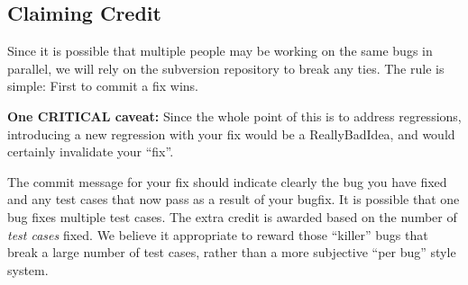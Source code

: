 \documentclass{article}
\begin{document}
\subsection{Claiming Credit}
Since it is possible that multiple people may be working on the same bugs in
parallel, we will rely on the subversion repository to break any ties. The
rule is simple: First to commit a fix wins.

\vspace{1 em}
{\bf One CRITICAL caveat:} Since the whole point of this is to address
regressions, introducing a new regression with your fix would be a
ReallyBadIdea\texttrademark, and would certainly invalidate your ``fix''.
\vspace{1 em}

The commit message for your fix should indicate clearly the bug you have fixed
and any test cases that now pass as a result of your bugfix. It is possible
that one bug fixes multiple test cases. The extra credit is awarded based on
the number of {\em test cases} fixed. We believe it appropriate to reward
those ``killer'' bugs that break a large number of test cases, rather than a
more subjective ``per bug'' style system.
\end{document}
